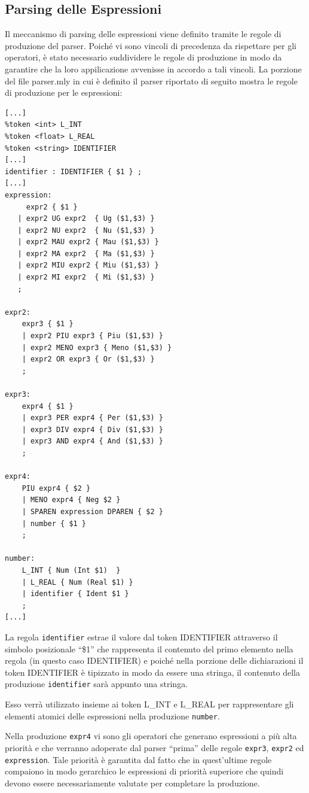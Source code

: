 \documentclass[a4paper,10pt]{article}
\begin{document}
\subsection{Parsing delle Espressioni}
Il meccanismo di parsing delle espressioni viene definito tramite le regole di
produzione del parser. Poich\'e vi sono vincoli di precedenza da rispettare 
per gli operatori, \`e stato necessario suddividere le regole di produzione in
modo da garantire che la loro appilicazione avvenisse in accordo a tali
vincoli.
La porzione del file parser.mly in cui \`e definito il parser riportato di
 seguito mostra le regole di produzione per le espressioni:
\begin{verbatim}
[...]
%token <int> L_INT
%token <float> L_REAL
%token <string> IDENTIFIER
[...]
identifier : IDENTIFIER { $1 } ;
[...]
expression:
     expr2 { $1 }
   | expr2 UG expr2  { Ug ($1,$3) }
   | expr2 NU expr2  { Nu ($1,$3) }
   | expr2 MAU expr2 { Mau ($1,$3) }
   | expr2 MA expr2  { Ma ($1,$3) }
   | expr2 MIU expr2 { Miu ($1,$3) }
   | expr2 MI expr2  { Mi ($1,$3) }
   ;

expr2:
    expr3 { $1 }
    | expr2 PIU expr3 { Piu ($1,$3) }
    | expr2 MENO expr3 { Meno ($1,$3) }
    | expr2 OR expr3 { Or ($1,$3) }
    ;

expr3:
    expr4 { $1 }
    | expr3 PER expr4 { Per ($1,$3) }
    | expr3 DIV expr4 { Div ($1,$3) }
    | expr3 AND expr4 { And ($1,$3) }
    ;

expr4:
    PIU expr4 { $2 }
    | MENO expr4 { Neg $2 }
    | SPAREN expression DPAREN { $2 }
    | number { $1 }
    ;

number:
    L_INT { Num (Int $1)  }
    | L_REAL { Num (Real $1) }
    | identifier { Ident $1 }
    ;
[...]
\end{verbatim}
La regola \texttt{identifier} estrae il valore dal token IDENTIFIER attraverso
il simbolo posizionale ``\$1'' che rappresenta il contenuto del primo
elemento 
nella regola (in questo caso IDENTIFIER) e poich\'e nella porzione delle
dichiarazioni il token IDENTIFIER \`e tipizzato in modo da essere una stringa,
il contenuto della produzione \texttt{identifier} sar\`a appunto una stringa.

Esso verr\`a utilizzato insieme ai token L\_INT e L\_REAL per rappresentare gli
elementi atomici delle espressioni nella produzione \texttt{number}.

Nella produzione \texttt{expr4} vi sono gli operatori che generano espressioni 
a pi\`u alta priorit\`a e che verranno adoperate dal parser ``prima'' delle
regole \texttt{expr3}, \texttt{expr2} ed \texttt{expression}. Tale priorit\`a
\`e garantita dal fatto che in quest'ultime regole compaiono in modo
gerarchico le espressioni di priorit\`a superiore che quindi devono essere
necessariamente valutate per completare la produzione.
\end{document}
